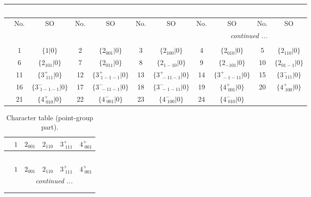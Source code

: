 \documentclass[fleqn,10pt,landscape]{article}
\begin{document}
\begin{itemize}
\begin{center}
\begin{longtable}{c|cc|cc|cc|cc|cc}
\multicolumn{10}{l}{\tablename\ \thetable{}} \\
 \hline \hline
 & No. & SO & No. & SO & No. & SO & No. & SO & No. & SO \\ \hline \endhead

 \hline \hline
\multicolumn{10}{r}{\footnotesize\it continued ...} \\ \endfoot

 \hline \hline
\multicolumn{10}{r}{} \\ \endlastfoot

 & 1 & $\{1|0\}$ & 2 & $\{2{}_{001}|0\}$ & 3 & $\{2{}_{100}|0\}$ & 4 & $\{2{}_{010}|0\}$ & 5 & $\{2{}_{110}|0\}$ \\
& 6 & $\{2{}_{101}|0\}$ & 7 & $\{2{}_{011}|0\}$ & 8 & $\{2{}_{1-10}|0\}$ & 9 & $\{2{}_{-101}|0\}$ & 10 & $\{2{}_{01-1}|0\}$ \\
& 11 & $\{3^{+}_{\,\,111}|0\}$ & 12 & $\{3^{+}_{\,\,1-1-1}|0\}$ & 13 & $\{3^{+}_{\,\,-11-1}|0\}$ & 14 & $\{3^{+}_{\,\,-1-11}|0\}$ & 15 & $\{3^{-}_{\,\,111}|0\}$ \\
& 16 & $\{3^{-}_{\,\,1-1-1}|0\}$ & 17 & $\{3^{-}_{\,\,-11-1}|0\}$ & 18 & $\{3^{-}_{\,\,-1-11}|0\}$ & 19 & $\{4^{+}_{\,\,001}|0\}$ & 20 & $\{4^{+}_{\,\,100}|0\}$ \\
& 21 & $\{4^{+}_{\,\,010}|0\}$ & 22 & $\{4^{-}_{\,\,001}|0\}$ & 23 & $\{4^{-}_{\,\,100}|0\}$ & 24 & $\{4^{-}_{\,\,010}|0\}$ &  &  \\
\end{longtable}
\end{center}
\begin{center}
\renewcommand{\arraystretch}{1.0}
\begin{longtable}{c|rrrrr}
\caption{Character table (point-group part).}
 \\
 \hline \hline
 & $ 1 $ & $ 2{}_{001} $ & $ 2{}_{110} $ & $ 3^{+}_{\,\,111} $ & $ 4^{+}_{\,\,001} $ \\ \hline \endfirsthead

\multicolumn{5}{l}{\tablename\ \thetable{}} \\
 \hline \hline
 & $ 1 $ & $ 2{}_{001} $ & $ 2{}_{110} $ & $ 3^{+}_{\,\,111} $ & $ 4^{+}_{\,\,001} $ \\ \hline \endhead

 \hline \hline
\multicolumn{5}{r}{\footnotesize\it continued ...} \\ \endfoot

 \hline \hline
\multicolumn{5}{r}{} \\ \endlastfoot


\end{longtable}
\end{center}
\end{itemize}
\end{document}
